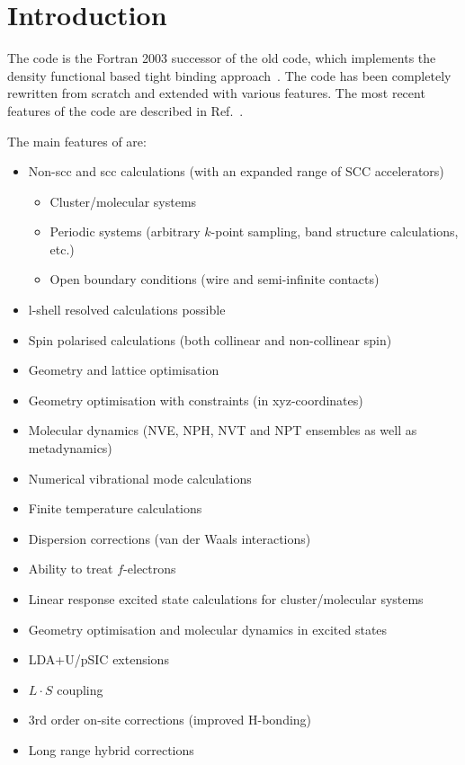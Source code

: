 \chapter{Introduction}

The code {\dftbp} is the Fortran 2003 successor of the old {\dftb}
code, which implements the density functional based tight binding
approach~\cite{frauenheim-JPCM-14-3015}. The code has been completely
rewritten from scratch and extended with various features. The most
recent features of the code are described in
Ref.~\cite{dftbp-2020paper}.

The main features of {\dftbp} are:
\begin{itemize}
\item Non-scc and scc calculations (with an expanded range of SCC
  accelerators)
  \begin{itemize}
  \item Cluster/molecular systems
  \item Periodic systems (arbitrary $k$-point sampling, band structure
    calculations, etc.)
  \item Open boundary conditions (wire and semi-infinite contacts)
  \end{itemize}
\item l-shell resolved calculations possible
\item Spin polarised calculations (both collinear and non-collinear
  spin)
\item Geometry and lattice optimisation
\item Geometry optimisation with constraints (in xyz-coordinates)
\item Molecular dynamics (NVE, NPH, NVT and NPT ensembles as well as
  metadynamics)
\item Numerical vibrational mode calculations
\item Finite temperature calculations
\item Dispersion corrections (van der Waals interactions)
\item Ability to treat $f$-electrons
\item Linear response excited state calculations for cluster/molecular systems
\item Geometry optimisation and molecular dynamics in excited states
\item LDA+U/pSIC extensions
\item $L \cdot S$ coupling
\item 3rd order on-site corrections (improved H-bonding)
\item Long range hybrid corrections

\end{itemize}
